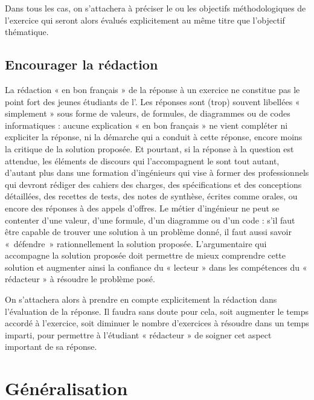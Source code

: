 Dans tous les cas, on s'attachera à préciser le ou les objectifs méthodologiques 
de l'exercice qui seront alors évalués explicitement au même titre que l'objectif thématique.

\subsection{Encourager la rédaction}\label{subsec:redaction}
La rédaction « en bon français » de la réponse à un exercice ne constitue pas le point 
fort des jeunes étudiants de l'\enib. Les réponses sont (trop) souvent libellées 
« simplement » sous forme de valeurs, de formules, de diagrammes ou de codes informatiques : 
aucune explication « en bon français » ne vient compléter ni expliciter la réponse, 
ni la démarche qui a conduit à cette réponse, encore moins la critique de la solution proposée.
Et pourtant, si la réponse à la question est attendue, les éléments de discours 
qui l'accompagnent le sont tout autant, d'autant plus dans une formation d'ingénieurs
qui vise à former des professionnels qui devront rédiger des cahiers des charges,
des spécifications et des conceptions détaillées, des recettes de tests, des notes
de synthèse, écrites comme orales, ou encore des réponses à des appels d'offres.
Le métier d'ingénieur ne peut se contenter d'une valeur, d'une formule, d'un diagramme 
ou d'un code : s'il faut être capable de trouver une solution à un problème donné,
il faut aussi savoir «~défendre~» rationnellement la solution proposée.
L'argumentaire qui accompagne la solution proposée doit permettre de mieux comprendre 
cette solution et augmenter ainsi la confiance du « lecteur » dans les compétences du
« rédacteur » à résoudre le problème posé.

On s'attachera alors à prendre en compte explicitement la rédaction dans
l'évaluation de la réponse. Il faudra sans doute pour cela, soit augmenter le temps
accordé à l'exercice, soit diminuer le nombre d'exercices à résoudre dans un temps 
imparti, pour permettre à l'étudiant « rédacteur » de soigner cet aspect important
de sa réponse.

\section{Généralisation}\label{sec:generalisation}

